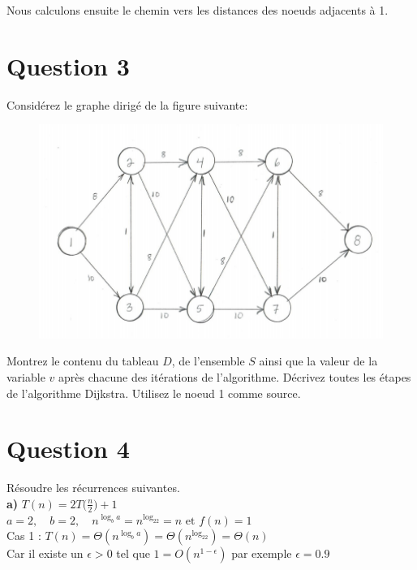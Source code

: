 \documentclass[12pt]{article}
\begin{document}
Nous calculons ensuite le chemin vers les distances des noeuds adjacents à 1.

\newpage

\section*{Question 3}
Considérez le graphe dirigé de la figure suivante:

\begin{figure}[H]
	\centering
	\includegraphics[width=12cm]{q3}
\end{figure}

Montrez le contenu du tableau \(D\), de l’ensemble \(S\) ainsi que la valeur de la variable \(v\) après chacune des itérations de l’algorithme. Décrivez toutes les étapes de l’algorithme Dijkstra. Utilisez le noeud 1 comme source.

\newpage

\section*{Question 4}
Résoudre les récurrences suivantes. \\

\textbf{a) } \(T(n)=2T\big(\frac{n}{2}\big)+1\) \\

\(a=2, \quad b=2, \quad n^{\log_ba} = n^{\log_22}=n \text{ et } f(n) = 1\) \\

Cas 1 : \(T(n) = \Theta(n^{\log_ba}) = \Theta(n^{\log_22}) = \Theta(n) \) \\

Car il existe un \(\epsilon>0\) tel que \(1 = O(n^{1-\epsilon}) \) par exemple \(\epsilon=0.9\) \\
\end{document}
